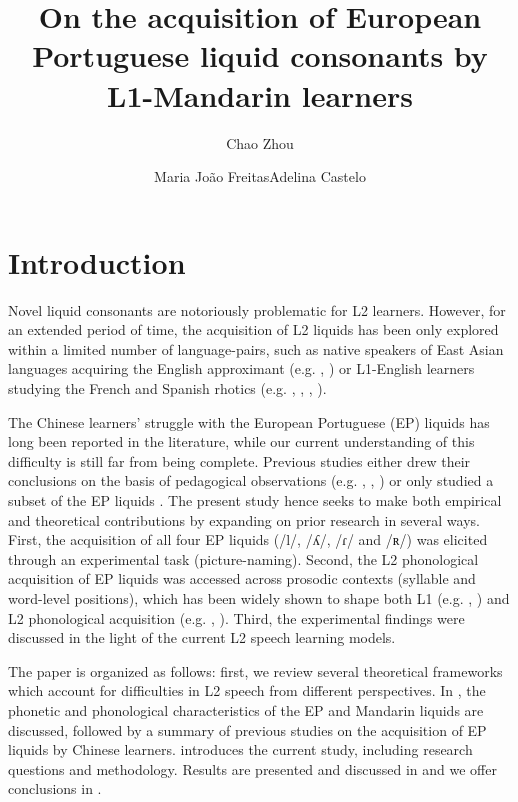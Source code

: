 \documentclass[output=paper]{../langscibook}
\author{Chao Zhou\affiliation{University of Lisbon}\and Maria João Freitas\affiliation{University of Lisbon}\lastand Adelina Castelo\affiliation{University of Lisbon}}
\title{On the acquisition of European Portuguese liquid consonants by L1-Mandarin learners}
\begin{document}
\maketitle
{}


\section{Introduction}

Novel liquid consonants are notoriously problematic for L2 learners. However, for an extended period of time, the acquisition of L2 liquids has been only explored within a limited number of language-pairs, such as native speakers of East Asian languages acquiring the English approximant (e.g. \citealt{AoyamaEtAl2004}, \citealt{Brown1998}) or L1-English learners studying the French and Spanish rhotics (e.g. \citealt{ColantoniSteele2007,ColantoniSteele2008}, \citealt{Face2006}, \citealt{Steele2009}, \citealt{Waltmunson2005}).

The Chinese learners’ struggle with the European Portuguese (EP) liquids has long been reported in the literature, while our current understanding of this difficulty is still far from being complete. Previous studies either drew their conclusions on the basis of pedagogical observations (e.g. \citealt{Batalha1995}, \citealt{EspadinhaSilva2009}, \citealt{Martins2008}) or only studied a subset of the EP liquids \citep{Oliveira2016}. The present study hence seeks to make both empirical and theoretical contributions by expanding on prior research in several ways. First, the acquisition of all four EP liquids (/l/, /ʎ/, /ɾ/ and /ʀ/) was elicited through an experimental task (picture-naming). Second, the L2 phonological acquisition of EP liquids was accessed across prosodic contexts (syllable and word-level positions), which has been widely shown to shape both L1 (e.g. \citealt{Fikkert1994}, \citealt{Freitas1997}) and L2 phonological acquisition (e.g. \citealt{Waltmunson2005}, \citealt{ColantoniSteele2008}). Third, the experimental findings were discussed in the light of the current L2 speech learning models.

The paper is organized as follows: first, we review several theoretical frameworks which account for difficulties in L2 speech from different perspectives. In , the phonetic and phonological characteristics of the EP and Mandarin liquids are discussed, followed by a summary of previous studies on the acquisition of EP liquids by Chinese learners.  introduces the current study, including research questions and methodology. Results are presented and discussed in  and we offer conclusions in .%
\end{document}

